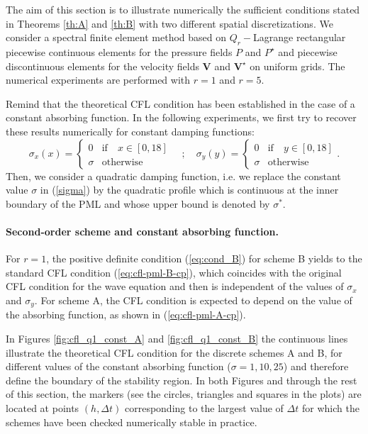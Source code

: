 \documentclass[a4paper]{article}
\def\bV{\boldsymbol{V}}
\def\bVs{\boldsymbol{V}^{\star}}
\def\Ps{P^{\star}}
\begin{document}
The aim of this section is to illustrate numerically the sufficient 
conditions stated in Theorems \ref{th:A} and \ref{th:B}
with two different spatial discretizations. We consider a spectral finite 
element method based on $Q_r-$Lagrange rectangular piecewise continuous 
elements for the pressure fields $P$ and $\Ps$ 
and piecewise discontinuous elements for the velocity fields $\bV$ and $\bVs$
on uniform grids. The numerical experiments are performed with $r=1$ and $r=5$. 

Remind that the theoretical CFL condition has been established in the case 
of a constant absorbing function. In the following experiments, we 
first  try to recover these results numerically for constant damping functions: 
\begin{equation}
\label{sigma}
\sigma_{x} (x)= \begin{cases}
0 &  \mbox{if}  \quad x \in [0,18] \\
\sigma & \mbox{otherwise}
\end{cases} \quad ; 
 \quad
\sigma_{y} (y)= \begin{cases}
0 &\mbox{if}  \quad y \in [0,18] \\
\sigma & \mbox{otherwise}
\end{cases} .
\end{equation}
Then, we consider a quadratic damping function, i.e. we replace the constant value $\sigma$ in 
(\ref{sigma}) by the quadratic profile which is  continuous at the inner boundary of the PML
 and whose upper bound is denoted by $\sigma^{*}$.


\paragraph{Second-order scheme and constant absorbing function.} 
For $r=1$, the positive definite condition (\ref{eq:cond_B})  for 
scheme B yields to the standard CFL condition (\ref{eq:cfl-pml-B-cp}),
which coincides with the original CFL condition for the wave equation 
and then is independent of the values of $\sigma_{x}$ and  $\sigma_{y}$. 
For scheme A, the CFL condition is expected to depend on the value of 
the absorbing function, as shown in (\ref{eq:cfl-pml-A-cp}). 

In Figures \ref{fig:cfl_q1_const_A} and \ref{fig:cfl_q1_const_B} the 
continuous lines illustrate the theoretical CFL condition for 
the discrete schemes A and B, for different values of the constant 
absorbing function  ($\sigma=1, 10, 25$) and therefore define the 
boundary of the stability region.
In both Figures and through the rest of this section, the markers 
(see the circles, triangles and squares in the plots) are located at 
points  $(h,\Delta t)$ corresponding to the largest value of 
$\Delta t$ for which  the schemes have been checked numerically stable 
in practice. 
\end{document}
